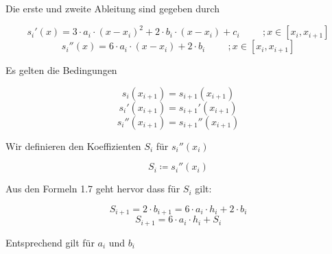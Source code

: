\documentclass[12pt,titlepage]{article}
\begin{document}
Die erste und zweite Ableitung sind gegeben durch
\newline

\begin{equation}
    s_i'(x) = 3\cdot a_i\cdot (x-x_i)^2+2\cdot b_i\cdot  (x-x_i)+c_i \hspace{1cm} ;x\in [x_i,x_{i+1}]
\end{equation}
\newline
\begin{equation}
    s_i''(x) = 6\cdot a_i\cdot (x-x_i)+2\cdot b_i \hspace{1cm} ;x\in [x_i,x_{i+1}]
\end{equation}
\newline

Es gelten die Bedingungen
\newline

\begin{equation}
    s_i(x_{i+1}) = s_{i+1}(x_{i+1})
\end{equation}
\newline
\begin{equation}
    s_i'(x_{i+1}) = s_{i+1}'(x_{i+1})
\end{equation}
\newline
\begin{equation}
    s_i''(x_{i+1}) = s_{i+1}''(x_{i+1})
\end{equation}
\newline

Wir definieren den Koeffizienten $S_i$ für $s_i''(x_i)$
\newline

\begin{equation}
    S_i \coloneqq s_i''(x_i)
\end{equation}
\newline

Aus den Formeln 1.7 geht hervor dass für $S_i$ gilt:
\newline

\begin{equation*}
    S_{i+1} = 2\cdot b_{i+1} = 6\cdot a_i\cdot h_i+2\cdot b_i
\end{equation*}
\newline
\begin{equation}
    S_{i+1} = 6\cdot a_i\cdot h_i+S_i
\end{equation}
\newline

Entsprechend gilt für $a_i$ und $b_i$
\newline
\end{document}
